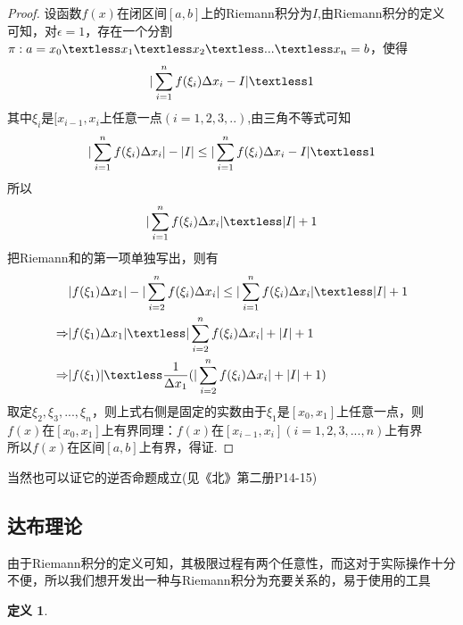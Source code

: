 \documentclass[12pt, a4paper, oneside]{ctexart}
\newtheorem{definition}[theorem]{定义}
\begin{document}
\begin{proof}
设函数$f(x)$在闭区间$[a,b]$上的Riemann积分为$I$,由Riemann积分的定义可知，对$\epsilon=1$，存在一个分割$ \pi:a=x_0 \textless x_1 \textless x_2 \textless ... \textless x_n=b$，使得
\begin{equation}
    |\sum_{i=1}^{n}f(\xi_i)\Delta x_i-I| \textless 1
\end{equation}
其中$\xi_i$是$[x_{i-1},x_i$上任意一点$(i=1,2,3,..)$,由三角不等式可知
\begin{equation}
     |\sum_{i=1}^{n}f(\xi_i)\Delta x_i|-|I|   \leq |\sum_{i=1}^{n}f(\xi_i)\Delta x_i-I| \textless 1
\end{equation}
所以
\begin{equation}
     |\sum_{i=1}^{n}f(\xi_i)\Delta x_i| \textless |I|+1
\end{equation}
把Riemann和的第一项单独写出，则有
\begin{equation}
    \begin{aligned}
        &|f(\xi_1)\Delta x_1|-|\sum_{i=2}^{n}f(\xi_i)\Delta x_i| \leq |\sum_{i=1}^{n}f(\xi_i)\Delta x_i| \textless |I|+1\\
        \Rightarrow &|f(\xi_1)\Delta x_1| \textless |\sum_{i=2}^{n}f(\xi_i)\Delta x_i| +|I|+1\\
        \Rightarrow &|f(\xi_1)| \textless \frac{1}{\Delta x_1}(|\sum_{i=2}^{n}f(\xi_i)\Delta x_i| +|I|+1)
    \end{aligned}
\end{equation}
取定$\xi_2,\xi_3,...,\xi_n$，则上式右侧是固定的实数由于$\xi_1$是$[x_0,x_1]$上任意一点，则$f(x)$在$[x_0,x_1]$上有界同理：$f(x)$在$[x_{i-1},x_i](i=1,2,3,...,n)$上有界\\
所以$f(x)$在区间$[a,b]$上有界，得证.
\end{proof}

\begin{remark}
当然也可以证它的逆否命题成立(见《北》第二册P14-15)
\end{remark}

\subsection{达布理论}
\begin{note}
由于Riemann积分的定义可知，其极限过程有两个任意性，而这对于实际操作十分不便，所以我们想开发出一种与Riemann积分为充要关系的，易于使用的工具
\end{note}

\begin{definition}

\end{definition}
\end{document}
